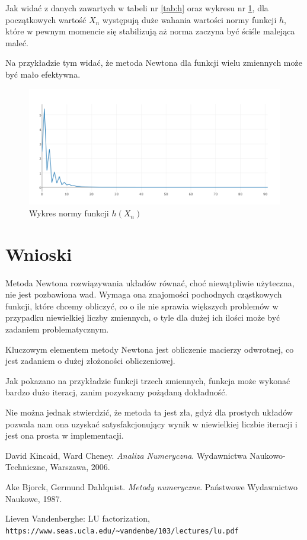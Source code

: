 \documentclass{article}
\begin{document}
    Jak widać z danych zawartych w tabeli nr \ref{tab:h} oraz wykresu nr \ref{fig:plot3},
    dla początkowych wartość $X_n$ występują duże wahania wartości normy funkcji
    $h$, które w pewnym momencie się stabilizują aż norma zaczyna być ściśle malejąca
    maleć.

    Na przykładzie tym widać, że metoda Newtona dla funkcji wielu zmiennych może
    być mało efektywna.
    \begin{figure}
      \includegraphics[width=\linewidth]{hplot.png}
      \caption{Wykres normy funkcji $h(X_n)$}
      \label{fig:plot3}
    \end{figure}
  \section{Wnioski}
    \paragraph{} Metoda Newtona rozwiązywania układów równać, choć niewątpliwie
    użyteczna, nie jest pozbawiona wad. Wymaga ona znajomości pochodnych cząstkowych
    funkcji, które chcemy obliczyć, co o ile nie sprawia większych problemów w
    przypadku niewielkiej liczby zmiennych, o tyle dla dużej ich ilości może być
    zadaniem problematycznym.

    Kluczowym elementem metody Newtona jest obliczenie macierzy odwrotnej, co jest
    zadaniem o dużej złożoności obliczeniowej.

    Jak pokazano na przykładzie funkcji trzech zmiennych, funkcja może wykonać bardzo
    dużo iteracj, zanim pozyskamy pożądaną dokładność.

    Nie można jednak stwierdzić, że metoda ta jest zła, gdyż dla prostych układów
    pozwala nam ona uzyskać satysfakcjonujący wynik w niewielkiej liczbie iteracji
    i jest ona prosta w implementacji.


    \begin{thebibliography}{9}
        David Kincaid, Ward Cheney.
        \textit{Analiza Numeryczna}.
        Wydawnictwa Naukowo-Techniczne, Warszawa, 2006.

        Ake Bjorck, Germund Dahlquist.
        \textit{Metody numeryczne}.
        Państwowe Wydawnictwo Naukowe, 1987.

        Lieven Vandenberghe:  LU factorization,\\
        \texttt{https://www.seas.ucla.edu/\~{}vandenbe/103/lectures/lu.pdf}
    \end{thebibliography}
\end{document}

